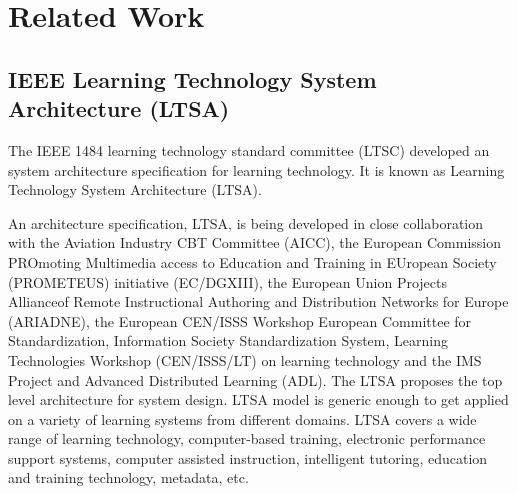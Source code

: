\chapter{Related Work}
\section{IEEE Learning Technology System Architecture (LTSA)}
The IEEE 1484 learning technology standard committee (LTSC) developed an system architecture specification for learning technology. 
It is known as Learning Technology System Architecture (LTSA).\par
  An architecture specification, LTSA, is being developed in close collaboration with the Aviation Industry CBT Committee (AICC),
the European Commission PROmoting Multimedia access to Education and Training in EUropean Society
(PROMETEUS) initiative (EC/DGXIII), the European Union Projects Allianceof Remote Instructional Authoring and Distribution Networks 
for Europe (ARIADNE), the European CEN/ISSS Workshop European Committee for Standardization, Information Society Standardization 
System, Learning Technologies Workshop (CEN/ISSS/LT) on learning technology and the IMS Project and Advanced
Distributed Learning (ADL). The LTSA proposes the top level architecture for system design. LTSA model is generic enough to get applied on a variety of learning systems from different domains. LTSA covers a 
wide range of learning technology, computer-based training, electronic performance support systems, computer assisted instruction, 
intelligent tutoring, education and training technology, metadata, etc\cite{ltsa}.
